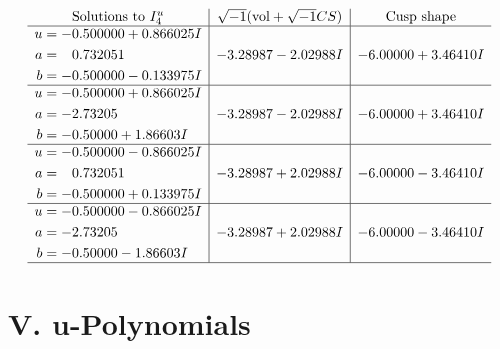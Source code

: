 \documentclass[1p]{elsarticle_modified}
\theoremstyle{definition}
\newcommand{\I}{\sqrt{-1}}
\begin{document}
$$\begin{array}{c|c|c}  
\text{Solutions to }I^u_{4}& \I (\text{vol} + \sqrt{-1}CS) & \text{Cusp shape}\\
 \hline 
\begin{aligned}
u &= -0.500000 + 0.866025 I \\
a &= \phantom{-}0.732051\phantom{ +0.000000I} \\
b &= -0.500000 - 0.133975 I\end{aligned}
 & -3.28987 - 2.02988 I & -6.00000 + 3.46410 I \\ \hline\begin{aligned}
u &= -0.500000 + 0.866025 I \\
a &= -2.73205\phantom{ +0.000000I} \\
b &= -0.50000 + 1.86603 I\end{aligned}
 & -3.28987 - 2.02988 I & -6.00000 + 3.46410 I \\ \hline\begin{aligned}
u &= -0.500000 - 0.866025 I \\
a &= \phantom{-}0.732051\phantom{ +0.000000I} \\
b &= -0.500000 + 0.133975 I\end{aligned}
 & -3.28987 + 2.02988 I & -6.00000 - 3.46410 I \\ \hline\begin{aligned}
u &= -0.500000 - 0.866025 I \\
a &= -2.73205\phantom{ +0.000000I} \\
b &= -0.50000 - 1.86603 I\end{aligned}
 & -3.28987 + 2.02988 I & -6.00000 - 3.46410 I\\
 \hline 
 \end{array}$$\newpage
\newpage\renewcommand{\arraystretch}{1}
\centering \section*{ V. u-Polynomials}
\end{document}
